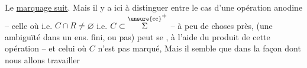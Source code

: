 Le \uline{marquage suit}.  Mais il y a ici à distinguer entre le cas d'une opération anodine  -- celle où   i.e. $C\cap R\ne\varnothing$ i.e. $C\subset\overset{\unsure{\mathrm{cc}}}{\Sigma}^+$ --  à peu de choses près, (une ambiguïté dans un ens. fini,  ou pas) peut se , à l'aide du produit de cette opération -- et celui où $C$ n'est pas marqué, Mais il semble que dans la façon dont nous allons travailler


